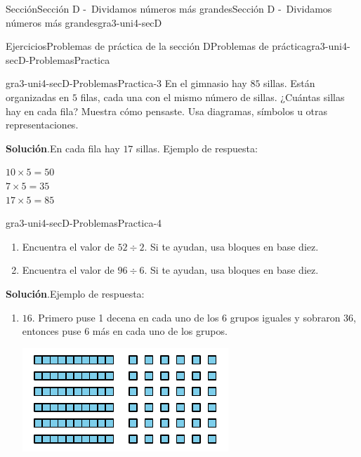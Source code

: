 \documentclass[oneside,10pt,]{article}
\newcommand{\blocktitlefont}{\relax}
\begin{document}
\begin{sectionptx}{Sección}{Sección D -~Dividamos números más grandes}{}{Sección D -~Dividamos números más grandes}{}{}{gra3-uni4-secD}
\begin{exercises-subsection}{Ejercicios}{Problemas de práctica de la sección D}{}{Problemas de práctica}{}{}{gra3-uni4-secD-ProblemasPractica}
\begin{divisionexercise}{1}{}{}{gra3-uni4-secD-ProblemasPractica-3}
En el gimnasio hay \(85\) sillas. Están organizadas en \(5\) filas, cada una con el mismo número de sillas. ¿Cuántas sillas hay en cada fila? Muestra cómo pensaste. Usa diagramas, símbolos u otras representaciones.%
\par\smallskip%
\noindent\textbf{\blocktitlefont Solución}.\hypertarget{gra3-uni4-secD-ProblemasPractica-3-2}{}\quad{}En cada fila hay \(17\) sillas. Ejemplo de respuesta:%
\par
\(10 \times 5 = 50\)\\
 \(7 \times 5 = 35\)\\
 \(17 \times 5 = 85\)%
\end{divisionexercise}%
\begin{divisionexercise}{2}{}{}{gra3-uni4-secD-ProblemasPractica-4}%
%
\begin{enumerate}[label={(\alph*)}]
\item{}Encuentra el valor de \(52 \div 2\). Si te ayudan, usa bloques en base diez.%
\item{}Encuentra el valor de \(96 \div 6\). Si te ayudan, usa bloques en base diez.%
\end{enumerate}
\par\smallskip%
\noindent\textbf{\blocktitlefont Solución}.\hypertarget{gra3-uni4-secD-ProblemasPractica-4-2}{}\quad{}Ejemplo de respuesta:%
%
\begin{enumerate}[label={(\alph*)}]
\item{}\begin{sidebyside}{2}{0}{0}{0}%
\begin{sbspanel}{0.5}%
\(16\). Primero puse 1 decena en cada uno de los 6 grupos iguales y sobraron 36, entonces puse 6 más en cada uno de los grupos.%
\end{sbspanel}%
\begin{sbspanel}{0.5}%
\includegraphics[width=\linewidth]{external/svg-source/tikz-file-152443.pdf}
\end{sbspanel}%

\end{sidebyside}
\end{enumerate}
\end{divisionexercise}
\end{exercises-subsection}
\end{sectionptx}
\end{document}
